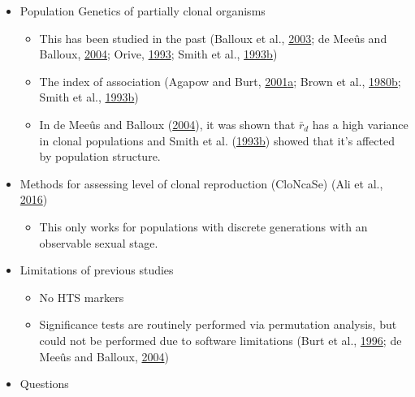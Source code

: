 \documentclass[double,12pt]{beavtex}
\providecommand{\tightlist}{%
  \setlength{\itemsep}{0pt}\setlength{\parskip}{0pt}}
\begin{document}
  \begin{itemize}
  \tightlist
  \item
    Population Genetics of partially clonal organisms
  
    \begin{itemize}
    \tightlist
    \item
      This has been studied in the past (Balloux et al.,
      \protect\hyperlink{ref-balloux2003population}{2003}; de Meeûs and
      Balloux, \protect\hyperlink{ref-de2004clonal}{2004}; Orive,
      \protect\hyperlink{ref-orive1993effective}{1993}; Smith et al.,
      \protect\hyperlink{ref-smith1993how}{1993}\protect\hyperlink{ref-smith1993how}{b})
    \item
      The index of association (Agapow and Burt,
      \protect\hyperlink{ref-Agapow_2001}{2001}\protect\hyperlink{ref-Agapow_2001}{a};
      Brown et al.,
      \protect\hyperlink{ref-brown1980multilocus}{1980}\protect\hyperlink{ref-brown1980multilocus}{b};
      Smith et al.,
      \protect\hyperlink{ref-smith1993how}{1993}\protect\hyperlink{ref-smith1993how}{b})
    \item
      In de Meeûs and Balloux
      (\protect\hyperlink{ref-de2004clonal}{2004}), it was shown that
      \(\bar{r}_d\) has a high variance in clonal populations and Smith et
      al.
      (\protect\hyperlink{ref-smith1993how}{1993}\protect\hyperlink{ref-smith1993how}{b})
      showed that it's affected by population structure.
    \end{itemize}
  \item
    Methods for assessing level of clonal reproduction (CloNcaSe) (Ali et
    al., \protect\hyperlink{ref-ali2016cloncase}{2016})
  
    \begin{itemize}
    \tightlist
    \item
      This only works for populations with discrete generations with an
      observable sexual stage.
    \end{itemize}
  \item
    Limitations of previous studies
  
    \begin{itemize}
    \tightlist
    \item
      No HTS markers
    \item
      Significance tests are routinely performed via permutation analysis,
      but could not be performed due to software limitations (Burt et al.,
      \protect\hyperlink{ref-burt1996molecular}{1996}; de Meeûs and
      Balloux, \protect\hyperlink{ref-de2004clonal}{2004})
    \end{itemize}
  \item
    Questions
  

\end{itemize}
\end{document}
